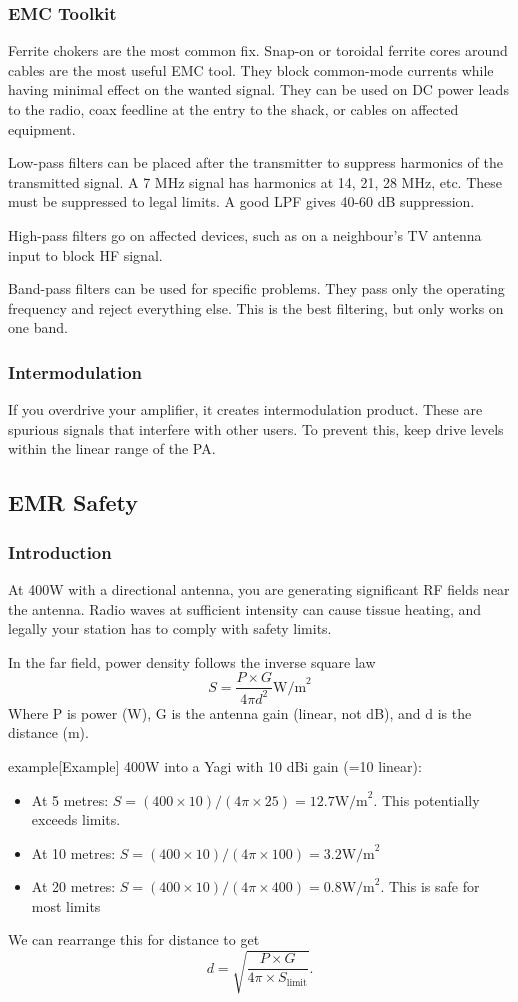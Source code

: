 \documentclass{article}
\begin{document}
\subsubsection{EMC Toolkit}
Ferrite chokers are the most common fix. Snap-on or toroidal ferrite cores around cables are the most useful EMC tool. They block common-mode currents while having minimal effect on the wanted signal. They can be used on DC power leads to the radio, coax feedline at the entry to the shack, or cables on affected equipment.

Low-pass filters can be placed after the transmitter to suppress harmonics of the transmitted signal. A 7 MHz signal has harmonics at 14, 21, 28 MHz, etc. These must be suppressed to legal limits. A good LPF gives 40-60 dB suppression.

High-pass filters go on affected devices, such as on a neighbour's TV antenna input to block HF signal.

Band-pass filters can be used for specific problems. They pass only the operating frequency and reject everything else. This is the best filtering, but only works on one band.

\subsubsection{Intermodulation}
If you overdrive your amplifier, it creates intermodulation product. These are spurious signals that interfere with other users. To prevent this, keep drive levels within the linear range of the PA.

\subsection{EMR Safety}
\subsubsection{Introduction}
At 400W with a directional antenna, you are generating significant RF fields near the antenna. Radio waves at sufficient intensity can cause tissue heating, and legally your station has to comply with safety limits.

In the far field, power density follows the inverse square law
\[
    S=\frac{P\times G}{4\pi d^2}\text{W/m}^2
\]
Where P is power (W), G is the antenna gain (linear, not dB), and d is the distance (m).
\begin{callout}{example}[Example]
    400W into a Yagi with 10 dBi gain (=10 linear):
    \begin{itemize}
        \item At 5 metres: $S=(400\times 10)/(4\pi \times 25)=12.7 \text{W/m}^2$. This potentially exceeds limits.
        \item At 10 metres: $S=(400\times 10)/(4\pi \times 100)=3.2 \text{W/m}^2$
        \item At 20 metres: $S=(400\times 10)/(4\pi \times 400)=0.8 \text{W/m}^2$. This is safe for most limits
    \end{itemize}
\end{callout}
We can rearrange this for distance to get
\[
    d=\sqrt{\frac{P\times G}{4\pi \times S_{\text{limit}}}}.
\]
\end{document}
